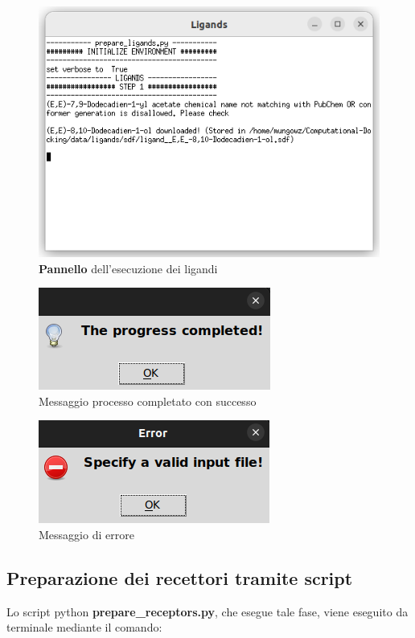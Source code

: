 \begin{figure}[H]
    \centering
    \includegraphics[scale=0.8]{immagini/ligandsExecute.png}
    \caption{\textbf{Pannello} dell'esecuzione dei ligandi}
    \label{fig:ligands Execute}
\end{figure}

\begin{figure}[H]
    \centering
    \includegraphics{immagini/progressCompletedLigands.png}
    \caption{Messaggio processo completato con successo}
    \label{fig:progress completed ligands}
\end{figure}

\begin{figure}[H]
    \centering
    \includegraphics{immagini/invalidInputLigands.png}
    \caption{Messaggio di errore}
    \label{fig:Invalid input ligands}
\end{figure}

\subsection{Preparazione dei recettori tramite script} \label{Preparazione dei recettori script}
Lo script python \textbf{prepare\_receptors.py}, che esegue tale fase, viene eseguito da terminale mediante il comando:

